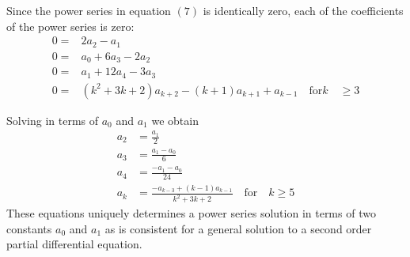 \documentclass{article}
\begin{document}
    Since the power series in equation $(7)$ is identically zero, each of the coefficients of the power series is zero:
    \begin{equation}
    \begin{split}
    	0 = & 2a_{2}-a_{1} \\ 
    	0 = & a_{0}+6a_{3}-2a_{2} \\
    	0 = & a_{1}+12a_{4}-3a_{3} \\
    	0 = & (k^{2}+3k+2)a_{k+2} -(k+1)a_{k+1} + a_{k-1} \quad \textrm{for}k  \quad \geq 3
    \end{split}
    \end{equation}
    
    Solving in terms of $a_{0}$ and $a_{1}$ we obtain
    \begin{equation}
    \begin{split}
    	a_{2} & = \frac{a_{1}}{2} \\ 
    	a_{3} & = \frac{a_{1}-a_{0}}{6} \\
    	a_{4} & = \frac{-a_{1}-a_{0}}{24} \\
    	a_{k} & = \frac{-a_{k-3}+(k-1)a_{k-1}}{k^{2}+3k+2} \quad \textrm{for} \quad k \geq 5
    \end{split}
    \end{equation}
    These equations uniquely determines a power series solution in terms of two constants $a_{0}$ and $a_{1}$ as is consistent for a general solution to a second order partial differential equation.
\end{document}
